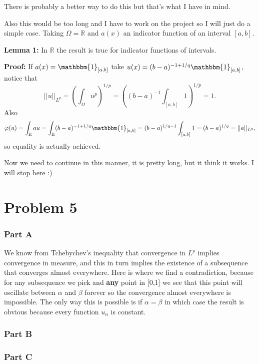 \documentclass{article}
\begin{document}
There is probably a better way to do this but that's what I have in mind.

Also this would be too long and I have to work on the project so I will just do
a simple case. Taking $\Omega = \mathbb{R}$ and $a(x)$ an indicator function of
an interval $[a,b]$.

\textbf{Lemma 1:} In $\mathbb{R}$ the result is true for indicator functions of
intervals.

\textbf{Proof:} If $a(x)=\mathbbm{1}_{[a,b]}$ take
$u(x)=(b-a)^{-1+1/q}\mathbbm{1}_{[a,b]}$, notice that
\[
	||u||_{L^p}=\left(\int_\Omega u^{p}\right)^{1/p}=\left(
	(b-a)^{-1}\int_{[a,b]} 1 \right)^{1/p} =1.
\]
Also
\[
	\varphi(u)= \int_\mathbb{R} au = \int_\mathbb{R} (b-a)^{-1+1/q}
	\mathbbm{1}_{[a,b]} =(b-a)^{1/q-1}\int_{[a,b]}1=(b-a)^{1/q}=||a||_{L^q},
\]
so equality is actually achieved.

Now we need to continue in this manner, it is pretty long, but it think it
works. I will stop here :)
\section*{Problem 5}
\subsubsection*{Part A}
We know from Tchebychev's inequality that convergence in $L^p$ implies
convergence in measure, and this in turn implies the existence of a subsequence
that converges almost everywhere. Here is where we find a contradiction,
because for any subsequence we pick and \textbf{any} point in [0,1] we see that
this point will oscillate between $\alpha$ and $\beta$ forever so the
convergence almost everywhere is impossible. The only way this is possible is
if $\alpha = \beta$ in which case the result is obvious because every function
$u_n$ is constant.
\subsubsection*{Part B}
\subsubsection*{Part C}
\end{document}
